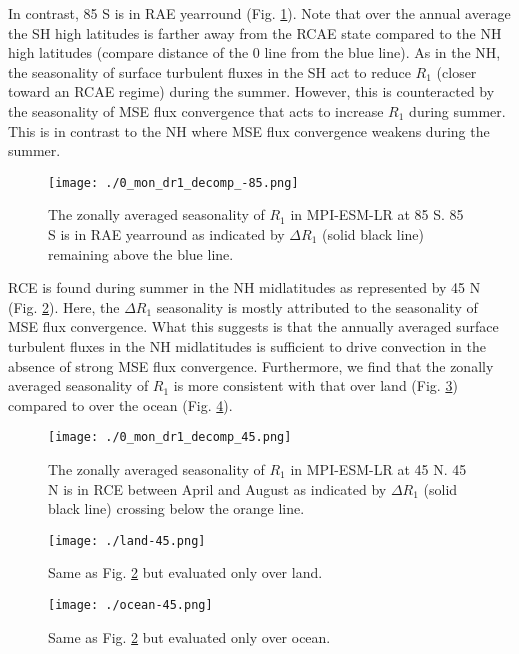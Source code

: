 \documentclass[11pt]{article}
\begin{document}
In contrast, 85 S is in RAE yearround (Fig. \ref{fig:orgfe1e257}). Note that over the annual average the SH high latitudes is farther away from the RCAE state compared to the NH high latitudes (compare distance of the 0 line from the blue line). As in the NH, the seasonality of surface turbulent fluxes in the SH act to reduce \(R_1\) (closer toward an RCAE regime) during the summer. However, this is counteracted by the seasonality of MSE flux convergence that acts to increase \(R_1\) during summer. This is in contrast to the NH where MSE flux convergence weakens during the summer.

\begin{figure}[htbp]
\centering
\texttt{[image: ./0\_mon\_dr1\_decomp\_-85.png]}
\caption{\label{fig:orgfe1e257}The zonally averaged seasonality of \(R_1\) in MPI-ESM-LR at 85 S. 85 S is in RAE yearround as indicated by \(\Delta R_1\) (solid black line) remaining above the blue line.}
\end{figure}

RCE is found during summer in the NH midlatitudes as represented by 45 N (Fig. \ref{fig:org70c84e4}). Here, the \(\Delta R_1\) seasonality is mostly attributed to the seasonality of MSE flux convergence. What this suggests is that the annually averaged surface turbulent fluxes in the NH midlatitudes is sufficient to drive convection in the absence of strong MSE flux convergence. Furthermore, we find that the zonally averaged seasonality of \(R_1\) is more consistent with that over land (Fig. \ref{fig:org3c70725}) compared to over the ocean (Fig. \ref{fig:orga73f0c0}).

\begin{figure}[htbp]
\centering
\texttt{[image: ./0\_mon\_dr1\_decomp\_45.png]}
\caption{\label{fig:org70c84e4}The zonally averaged seasonality of \(R_1\) in MPI-ESM-LR at 45 N. 45 N is in RCE between April and August as indicated by \(\Delta R_1\) (solid black line) crossing below the orange line.}
\end{figure}

\begin{figure}[htbp]
\centering
\texttt{[image: ./land-45.png]}
\caption{\label{fig:org3c70725}Same as Fig. \ref{fig:org70c84e4} but evaluated only over land.}
\end{figure}

\begin{figure}[htbp]
\centering
\texttt{[image: ./ocean-45.png]}
\caption{\label{fig:orga73f0c0}Same as Fig. \ref{fig:org70c84e4} but evaluated only over ocean.}
\end{figure}
\end{document}
